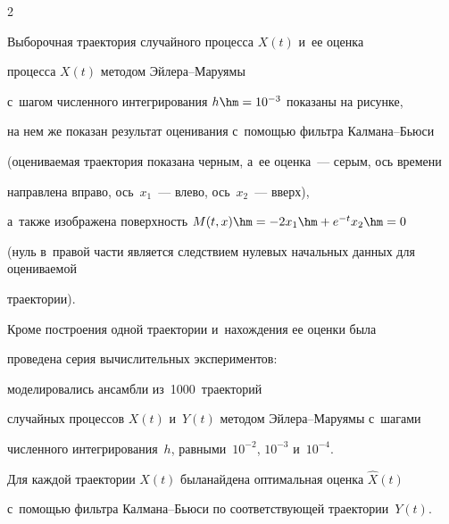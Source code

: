 \begin{multicols}{2}
{\begin{center}
{ }





\end{center}





\noindent

{\small{Выборочная траектория случайного процесса $X(t)$ и~ее оценка}}

}



\vspace*{9pt}



\addtocounter{figure}{1}



\noindent

  процесса $X(t)$ методом Эй\-ле\-ра--Ма\-ру\-ямы 

с~шагом численного интегрирования $h \hm= 10^{-3}$ показаны на рисунке, 

на нем же показан результат оценивания с~по\-мощью фильтра Кал\-ма\-на--Бью\-си 

(оце\-ни\-ва\-емая траектория показана черным, а~ее оценка~--- серым, ось времени 

направлена вправо, ось~$x_1$~--- влево, ось~$x_2$~--- вверх), 

а~также изображена поверхность $M(t,x) \hm= -2 x_1 \hm+ {e}^{-t} x_2 \hm= 0$ 

(нуль в~правой час\-ти является следствием нулевых начальных данных для оцениваемой 

траектории).





Кроме построения одной траектории и~на\-хож\-де\-ния ее оценки была 

проведена серия вы\-чис\-ли\-тель\-ных экспериментов: 

моделировались ан\-самб\-ли из~1000~траекторий 

случайных процессов $X(t)$ и~$Y(t)$ методом Эй\-ле\-ра--Ма\-ру\-ямы с~шагами %

чис\-лен\-но\-го интегрирования~$h$, равными~$10^{-2}$, $10^{-3}$ и~$10^{-4}$. 

Для каждой траектории $X(t)$ была\linebreak найде\-на оптимальная оценка $\hat X(t)$ 

с~по\-мощью фильт\-ра Кал\-ма\-на--Бью\-си по соответствующей траектории~$Y(t)$. 


\end{multicols}
